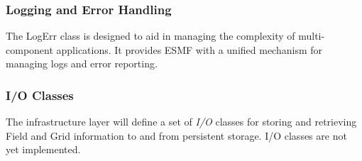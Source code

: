\subsubsection{Logging and Error Handling}
The LogErr class is designed to aid in managing the complexity of 
multi-component applications. It provides ESMF with a unified mechanism 
for managing logs and error reporting.

\subsubsection{I/O Classes}
The infrastructure layer will define a set of {\it I/O} classes for storing and retrieving Field and Grid information to and from persistent storage.  I/O classes are not yet implemented.





